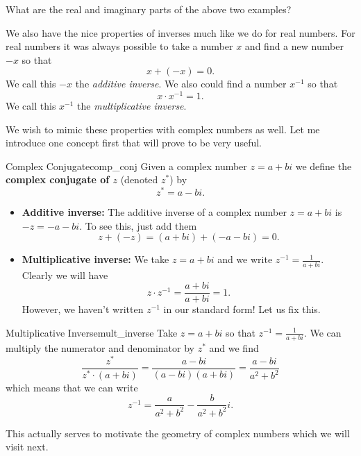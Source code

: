        \begin{exercise}
        What are the real and imaginary parts of the above two examples?
        \end{exercise}
        
        We also have the nice properties of inverses much like we do for real numbers.  For real numbers it was always possible to take a number $x$ and find a new number $-x$ so that
        \[
        x+(-x)=0.
        \]
        We call this $-x$ the \emph{additive inverse}.  We also could find a number $x^{-1}$ so that
        \[
        x\cdot x^{-1}=1.
        \]
        We call this $x^{-1}$ the \emph{multiplicative inverse}. 
        
        We wish to mimic these properties with complex numbers as well.  Let me introduce one concept first that will prove to be very useful.
        
        \begin{df}{Complex Conjugate}{comp_conj}
        Given a complex number $z=a+bi$ we define the \textbf{complex conjugate of $z$} (denoted $z^*$) by
        \[
        z^* = a-bi.
        \]
        \end{df}
        
        \begin{itemize}
            \item \textbf{Additive inverse:} The additive inverse of a complex number $z=a+bi$ is $-z=-a-bi$.  To see this, just add them
            \[
            z+(-z)=(a+bi)+(-a-bi)=0.
            \]
            \item \textbf{Multiplicative inverse:} We take $z=a+bi$ and we write $z^{-1}=\frac{1}{a+bi}$.  Clearly we will have
            \[
            z\cdot z^{-1}=\frac{a+bi}{a+bi}=1.
            \]
            However, we haven't written $z^{-1}$ in our standard form! Let us fix this.
        \end{itemize}
        
        \begin{ex}{Multiplicative Inverse}{mult_inverse}
        Take $z=a+bi$ so that $z^{-1}=\frac{1}{a+bi}$.  We can multiply the numerator and denominator by $z^*$ and we find
        \[
        \frac{z^*}{z^*\cdot (a+bi)}=\frac{a-bi}{(a-bi)(a+bi)}=\frac{a-bi}{a^2+b^2}
        \]
        which means that we can write
        \[
        z^{-1}=\frac{a}{a^2+b^2}-\frac{b}{a^2+b^2}i.
        \]
        \end{ex}
        This actually serves to motivate the geometry of complex numbers which we will visit next.
        
